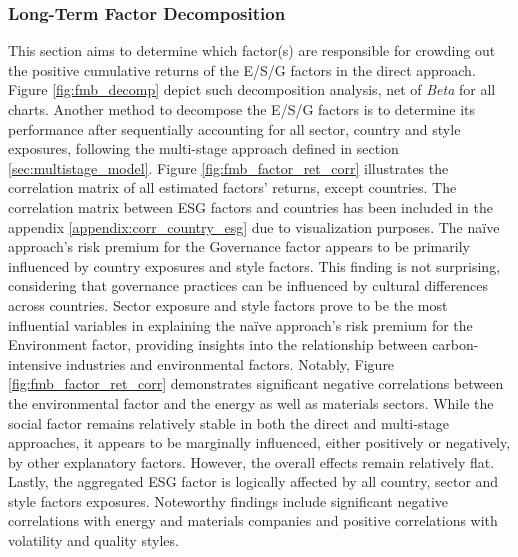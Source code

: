 \documentclass[11pt,a4paper]{article}
\begin{document}
\clearpage

\subsubsection{Long-Term Factor Decomposition}\label{subsec:fact_dec}

This section aims to determine which factor(s) are responsible for crowding out the positive cumulative returns of the E/S/G factors in the direct approach.
Figure \ref{fig:fmb_decomp} depict such decomposition analysis, net of \textit{Beta} for all charts.
Another method to decompose the E/S/G factors is to determine its performance after sequentially accounting for all sector, country and style exposures, following the multi-stage approach defined in section \ref{sec:multistage_model}.
Figure \ref{fig:fmb_factor_ret_corr} illustrates the correlation matrix of all estimated factors' returns, except countries.
The correlation matrix between ESG factors and countries has been included in the appendix \ref{appendix:corr_country_esg} due to visualization purposes. 
The naïve approach's risk premium for the Governance factor appears to be primarily influenced by country exposures and style factors. 
This finding is not surprising, considering that governance practices can be influenced by cultural differences across countries.
Sector exposure and style factors prove to be the most influential variables in explaining the naïve approach's risk premium for the Environment factor, providing insights into the relationship between carbon-intensive industries and environmental factors. 
Notably, Figure \ref{fig:fmb_factor_ret_corr} demonstrates significant negative correlations between the environmental factor and the energy as well as materials sectors. 
While the social factor remains relatively stable in both the direct and multi-stage approaches, it appears to be marginally influenced, either positively or negatively, by other explanatory factors. 
However, the overall effects remain relatively flat.
Lastly, the aggregated ESG factor is logically affected by all country, sector and style factors exposures.
Noteworthy findings include significant negative correlations with energy and materials companies and positive correlations with volatility and quality styles. 
\end{document}
